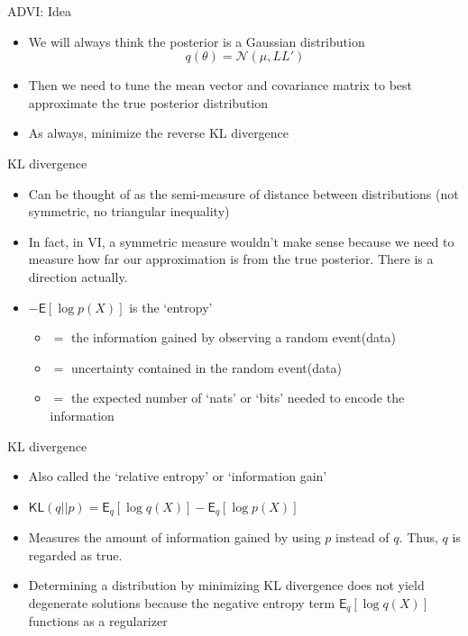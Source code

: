 \documentclass[color=usernames,dvipsnames]{beamer}
\begin{document}
\begin{frame}{ADVI: Idea}
  \begin{itemize}
    \item<+-> We will always think the posterior is a Gaussian distribution
    \begin{equation}
      q(\theta) = \mathcal{N}\left(\mu,LL'\right)
    \end{equation}
    \item<+-> Then we need to tune the mean vector and covariance matrix to best approximate the true posterior distribution
    \item<+-> As always, minimize the reverse KL divergence
  \end{itemize}
\end{frame}
\begin{frame}{KL divergence}
  \begin{itemize}
    \item<+-> Can be thought of as the semi-measure of distance between distributions (not symmetric, no triangular inequality)
    \item<+-> In fact, in VI, a symmetric measure wouldn't make sense because we need to measure how far our approximation is \textcolor{myorange}{from} the true posterior. There is a direction actually.
    \item<+-> $-\mathsf{E}\left[\log p(X)\right]$ is the `entropy'
    \begin{itemize}
      \item $=$ the information gained by observing a random event(data)
      \item $=$ uncertainty contained in the random event(data)
      \item $=$ the expected number of `nats' or `bits' needed to encode the information
    \end{itemize}
  \end{itemize}
\end{frame}
\begin{frame}{KL divergence}
  \begin{itemize}
    \item<+-> Also called the `relative entropy' or `information gain'
    \item<+-> $\mathsf{KL}(q||p)=\mathsf{E}_{q}\left[\log q(X)\right]-\mathsf{E}_{q}\left[\log p(X)\right]$
    \item<+-> Measures the amount of information gained by using $p$ instead of $q$. Thus, $q$ is regarded as \textcolor{myblue}{true}.
    \item<+-> Determining a distribution by minimizing KL divergence does not yield degenerate solutions because the negative entropy term $\mathsf{E}_{q}\left[\log q(X)\right]$ functions as a regularizer
  \end{itemize}
\end{frame}
\end{document}
